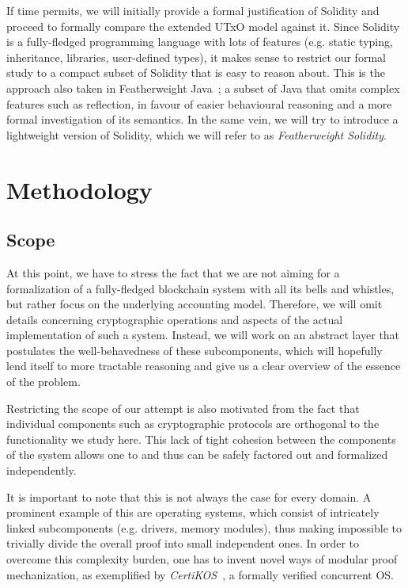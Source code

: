 \documentclass[acmsmall,nonacm=true,screen=true]{acmart}
\begin{document}
If time permits, we will initially provide a formal justification of Solidity and proceed to
formally compare the extended UTxO model against it.
Since Solidity is a fully-fledged programming language with lots of features
(e.g. static typing, inheritance, libraries, user-defined types), it makes sense to 
restrict our formal study to a compact subset of Solidity that is easy to reason about.
This is the approach also taken in Featherweight Java~\cite{featherweightjava}; a subset
of Java that omits complex features such as reflection, in favour of easier behavioural reasoning
and a more formal investigation of its semantics.
In the same vein, we will try to introduce a lightweight version of Solidity, which we will refer to as
\textit{Featherweight Solidity}.

\section{Methodology}
\label{sec:methodology}

\subsection{Scope}
At this point, we have to stress the fact that we are not aiming for a formalization of a fully-fledged 
blockchain system with all its bells and whistles, but rather focus on the underlying accounting model.
Therefore, we will omit details concerning cryptographic operations and aspects of the actual implementation
of such a system. Instead, we will work on an abstract layer that postulates the well-behavedness of these
subcomponents, which will hopefully lend itself to more tractable reasoning and
give us a clear overview of the essence of the problem.

Restricting the scope of our attempt is also motivated from the fact that individual
components such as cryptographic protocols are orthogonal to the functionality we study here.
This lack of tight cohesion between the components of the system allows one to 
and thus can be safely factored out and formalized independently.

It is important to note that this is not always the case for every domain. A prominent example of
this are operating systems, which consist of intricately linked subcomponents (e.g. drivers, memory modules),
thus making impossible to trivially divide the overall proof into small independent ones.
In order to overcome this complexity burden, one has to invent novel ways of modular proof mechanization, as
exemplified by \textit{CertiKOS}~\cite{certikos}, a formally verified concurrent OS.
\end{document}
